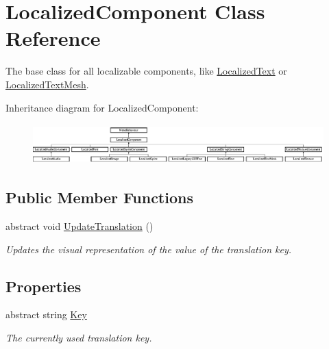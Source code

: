 \hypertarget{class_localized_component}{}\section{Localized\+Component Class Reference}
\label{class_localized_component}


The base class for all localizable components, like \hyperlink{class_localized_text}{Localized\+Text} or \hyperlink{class_localized_text_mesh}{Localized\+Text\+Mesh}.  


Inheritance diagram for Localized\+Component\+:\begin{figure}[H]
\begin{center}
\leavevmode
\includegraphics[height=1.564246cm]{class_localized_component}
\end{center}
\end{figure}
\subsection*{Public Member Functions}
\begin{DoxyCompactItemize}
\item 
abstract void \hyperlink{class_localized_component_a74e7c07ec348cebcd9be67364a66a81d}{Update\+Translation} ()
\begin{DoxyCompactList}\small\item\em Updates the visual representation of the value of the translation key. \end{DoxyCompactList}\end{DoxyCompactItemize}
\subsection*{Properties}
\begin{DoxyCompactItemize}
\item 
abstract string \hyperlink{class_localized_component_a5672af523f3b1f50544b918daa719405}{Key}
\begin{DoxyCompactList}\small\item\em The currently used translation key. \end{DoxyCompactList}\end{DoxyCompactItemize}


